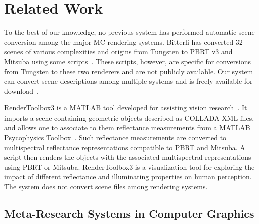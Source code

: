 \section{Related Work}
\label{(sec:related_work)}

To the best of our knowledge, no previous system has performed automatic scene conversion among the major MC rendering systems. 
Bitterli has converted 32 scenes of various complexities and origins from Tungsten to PBRT v3 and Mitsuba using some scripts~\cite{tungsten}. These scripts, however, are specific for conversions from Tungsten to these two renderers and are not publicly available. 
Our system can convert scene descriptions among multiple systems and is freely available for download~\cite{sceneConverter}.

RenderToolbox3 is a MATLAB tool developed for assisting vision research~\cite{rendertoolbox}. It imports a scene containing geometric objects described as COLLADA XML files, and allows one to associate to them reflectance measurements from a MATLAB Psycophysics Toolbox~\cite{Brainard1997}. Such reflectance measurements are converted to multispectral reflectance representations compatible to PBRT and Mitsuba. A script then renders the objects with the associated multispectral representations using PBRT or Mitsuba. RenderToolbox3 is a visualization tool for exploring the impact of different reflectance and illuminating properties on human perception.       
The system does not 
convert scene files among rendering systems. 

\subsection{Meta-Research Systems in Computer Graphics}


